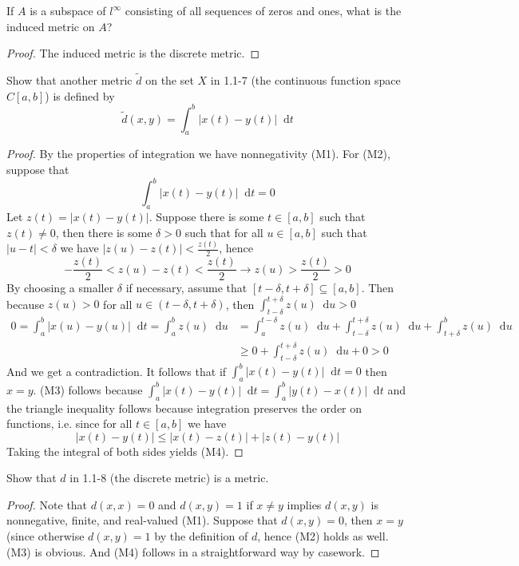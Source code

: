 \documentclass[12pt]{article}
\newcommand{\seq}{\subseteq}
\newcommand{\de}{\delta}
\newcommand*\dif{\mathop{}\!\mathrm{d}}
\newenvironment{exercise}[2][Exercise]{\begin{trivlist}
\item[\hskip \labelsep {\bfseries #1}\hskip \labelsep {\bfseries #2.}]}{\end{trivlist}}
\begin{document}
\begin{exercise}{1.1.7}
    If $A$ is a subspace of $l^{\infty}$ consisting of all sequences of zeros and ones, what is the induced metric on $A$?
\end{exercise}
\begin{proof}
    The induced metric is the discrete metric.
\end{proof}

\begin{exercise}{1.1.8}
    Show that another metric $\tilde{d}$ on the set $X$ in 1.1-7 (the continuous function space $C[a, b]$) is defined by
    \[ \tilde{d}(x, y) = \int_a^b |x(t) - y(t)| \dif t \]
\end{exercise}
\begin{proof}
    By the properties of integration we have nonnegativity (M1). For (M2), suppose that
    \[ \int_a^b |x(t) - y(t)| \dif t = 0 \]
    Let $z(t) = |x(t) - y(t)|$. Suppose there is some $t \in [a, b]$ such that $z(t) \neq 0$, then there is some $\de > 0$ such that for all $u \in [a, b]$ such that $|u-t| < \de$ we have $|z(u) - z(t)| < \frac{z(t)}{2}$, hence 
    \[ -\frac{z(t)}{2} < z(u) - z(t) < \frac{z(t)}{2} \rightarrow z(u) > \frac{z(t)}{2} > 0 \]
    By choosing a smaller $\de$ if necessary, assume that $[t-\de, t+\de] \seq [a, b]$. Then because $z(u) > 0$ for all $u \in (t-\de, t+\de)$, then $\int_{t-\de}^{t + \de} z(u) \dif u > 0$
    \begin{align*}
        0 = \int_a^b |x(u) - y(u)| \dif t = \int_a^b z(u) \dif u &= \int_a^{t-\de} z(u) \dif u + \int_{t-\de}^{t + \de} z(u) \dif u + \int_{t+\de}^{b} z(u) \dif u \\
        &\geq 0 +  \int_{t-\de}^{t + \de} z(u) \dif u + 0 > 0
    \end{align*}
    And we get a contradiction. It follows that if $\int_a^b |x(t) - y(t)| \dif t = 0$ then $x = y$. (M3) follows because $\int_a^b |x(t) - y(t)| \dif t = \int_a^b |y(t) - x(t)| \dif t$ and the triangle inequality follows because integration preserves the order on functions, i.e. since for all $t \in [a, b]$ we have
    \[ |x(t) - y(t)| \leq |x(t) - z(t)| + |z(t) - y(t)| \]
    Taking the integral of both sides yields (M4).
\end{proof}

\begin{exercise}{1.1.9}
    Show that $d$ in 1.1-8 (the discrete metric) is a metric.
\end{exercise}
\begin{proof}
    Note that $d(x, x) = 0$ and $d(x, y) = 1$ if $x \neq y$ implies $d(x, y)$ is nonnegative, finite, and real-valued (M1). Suppose that $d(x, y) = 0$, then $x = y$ (since otherwise $d(x, y) = 1$ by the definition of $d$, hence (M2) holds as well. (M3) is obvious. And (M4) follows in a straightforward way by casework.
\end{proof}
\end{document}
